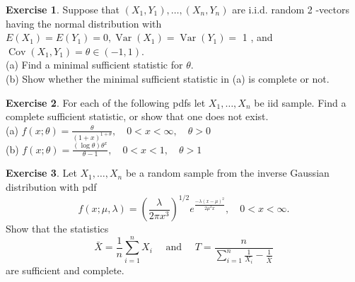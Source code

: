 \documentclass{article}
\theoremstyle{definition}
\newtheorem*{exercise*}{Exercise}
\begin{document}
	\begin{exercise*}
		Suppose that $\left(X_1, Y_1\right), \ldots,\left(X_n, Y_n\right)$ are i.i.d. random 2 -vectors having the normal distribution with $E\left(X_1\right)=E\left(Y_1\right)=0, \operatorname{Var}\left(X_1\right)=\operatorname{Var}\left(Y_1\right)=$ 1 , and $\operatorname{Cov}\left(X_1, Y_1\right)=\theta \in(-1,1)$.\\
		(a) Find a minimal sufficient statistic for $\theta$.\\
		(b) Show whether the minimal sufficient statistic in (a) is complete or not.
	\end{exercise*}
	\begin{exercise*}
		For each of the following pdfs let $X_1, \ldots, X_n$ be iid sample. Find a complete sufficient statistic, or show that one does not exist.\\
		(a) $f(x;\theta)=\frac{\theta}{(1+x)^{1+\theta}}, \quad 0<x<\infty, \quad \theta>0$\\
		(b) $f(x;\theta)=\frac{(\log \theta) \theta^x}{\theta-1}, \quad 0<x<1, \quad \theta>1$\\
	\end{exercise*}
	\begin{exercise*}
		Let $X_1, \ldots, X_n$ be a random sample from the inverse Gaussian distribution with pdf
		$$
		f(x;\mu, \lambda)=\left(\frac{\lambda}{2 \pi x^3}\right)^{1 / 2} e^{\frac{-\lambda(x-\mu)^2}{2 \mu^2 x}}, \quad 0<x<\infty .
		$$
		Show that the statistics
		$$
		\bar{X}=\frac{1}{n} \sum_{i=1}^n X_i \quad \text { and } \quad T=\frac{n}{\sum_{i=1}^n \frac{1}{X_i}-\frac{1}{\bar{X}}}
		$$
		are sufficient and complete.
	\end{exercise*}

\end{document}
